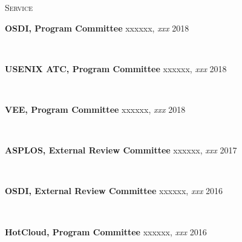 \documentclass[10pt,times]{report}
\newlength{\sectiongap}
\newlength{\entrygap}
\newlength{\sectioncolwidth}
\newlength{\colgap}
\newlength{\stuffwidth}
\def\ifEqString#1#2{\def\testa{#1}\def\testb{#2}%
  \ifx\testa\testb}
\newenvironment{rtable}{
  \begin{minipage}{\textwidth}
  }{
  \end{minipage}
}
\newenvironment{rentry}[3][xxx]{
  \begin{minipage}[t]{\hsize}
    \textbf{#2}\ifEqString{#1}{xxx}\relax\else, \textit{#1}\fi
    \hspace{\stretch{1}} #3 \\
  }{
    \removelastskip
  \end{minipage}
  \\[\entrygap]  %
}
\newcommand{\rline}[2]{
  \begin{minipage}[t]{\hsize}
    #1 \hspace{\stretch{1}} #2
  \end{minipage} \\
}
\newenvironment{rsection}[1]{
  \begin{minipage}[t]{\sectioncolwidth}
    \textsc{#1}
  \end{minipage}
  \hspace{\colgap}
  \begin{minipage}[t]{\stuffwidth}
  }{
    \removelastskip
  \end{minipage}
  \\[\sectiongap]
}
\begin{document}
\begin{rtable}
\begin{rsection}{Service}
    \begin{rentry}{OSDI, Program Committee}{2018}
       \vspace{-0.7em}
    \end{rentry}
    \begin{rentry}{USENIX ATC, Program Committee}{2018}
       \vspace{-0.7em}
    \end{rentry}
    \begin{rentry}{VEE, Program Committee}{2018}
       \vspace{-0.7em}
    \end{rentry}
    \begin{rentry}{ASPLOS, External Review Committee}{2017}
       \vspace{-0.7em}
    \end{rentry}
    \begin{rentry}{OSDI, External Review Committee}{2016}
       \vspace{-0.7em}
    \end{rentry}
    \begin{rentry}{HotCloud, Program Committee}{2016}
       \vspace{-0.7em}
    \end{rentry}
  \end{rsection}

\end{rtable}
\end{document}
